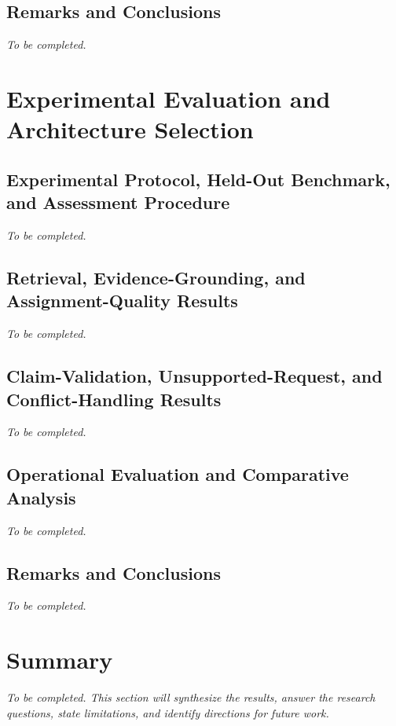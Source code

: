 \documentclass[12pt,a4paper]{report}
\numberwithin{equation}{chapter}
\begin{document}
\section{Remarks and Conclusions}
\textit{To be completed.}

\chapter{Experimental Evaluation and Architecture Selection}
\section{Experimental Protocol, Held-Out Benchmark, and Assessment Procedure}
\textit{To be completed.}
\section{Retrieval, Evidence-Grounding, and Assignment-Quality Results}
\textit{To be completed.}
\section{Claim-Validation, Unsupported-Request, and Conflict-Handling Results}
\textit{To be completed.}
\section{Operational Evaluation and Comparative Analysis}
\textit{To be completed.}
\section{Remarks and Conclusions}
\textit{To be completed.}

\chapter*{Summary}
\textit{To be completed. This section will synthesize the results, answer the research questions, state limitations, and identify directions for future work.}

\clearpage


\end{document}
